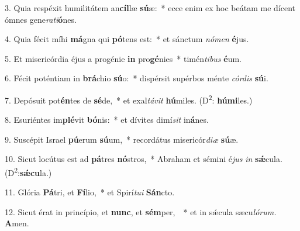 \item 3. Quia respéxit humilitátem an\textbf{cíl}læ \textbf{sú}æ:~* ecce enim ex hoc beátam me dícent ómnes gene\textit{rati}\textbf{ó}nes.

\item 4. Quia fécit míhi \textbf{má}gna qui \textbf{pó}tens est:~* et sánctum \textit{nómen} \textbf{é}jus.

\item 5. Et misericórdia éjus a progénie \textbf{in} pro\textbf{gé}nies~* timén\textit{tibus} \textbf{é}um.

\item 6. Fécit poténtiam in \textbf{brá}chio \textbf{sú}o:~* dispérsit supérbos ménte \textit{córdis} \textbf{sú}i.

\item 7. Depósuit pot\textbf{én}tes de \textbf{sé}de,~* et exal\textit{távit} \textbf{hú}miles. (D\textsuperscript{2}: \textbf{húmi}les.)

\item 8. Esuriéntes im\textbf{plé}vit \textbf{bó}nis:~* et dívites dimí\textit{sit} in\textbf{á}nes.

\item 9. Suscépit Israel \textbf{pú}erum \textbf{sú}um,~* recordátus misericór\textit{diæ} \textbf{sú}æ.

\item 10. Sicut locútus est ad \textbf{pá}tres \textbf{nó}stros,~* Abraham et sémini é\textit{jus} \textit{in} \textbf{sǽ}cula. (D\textsuperscript{2}:\textbf{sǽcu}la.)

\item 11. Glória \textbf{Pá}tri, et \textbf{Fí}lio,~* et Spirí\textit{tui} \textbf{Sán}cto.

\item 12. Sicut érat in princípio, et \textbf{nunc}, et \textbf{sém}per, ~* et in sǽcula sæcu\textit{lórum.} \textbf{A}men.
